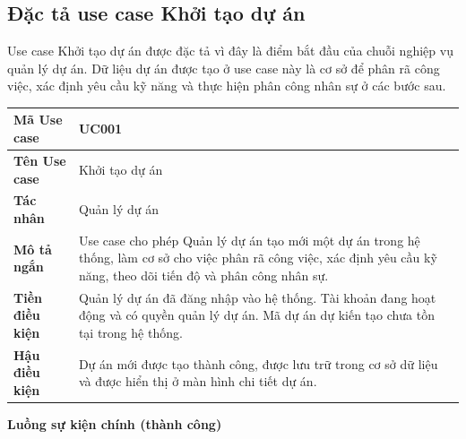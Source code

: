 \documentclass[../DoAn.tex]{subfiles}
\begin{document}
\newcommand{\ucTableText}{\small\setlength{\LTleft}{0pt}\setlength{\LTright}{0pt}}
\newcommand{\ucDataText}{\small\setlength{\tabcolsep}{2pt}\setlength{\LTleft}{0pt}\setlength{\LTright}{0pt}}

\subsection{Đặc tả use case Khởi tạo dự án}
\label{subsection:2.3.1}
Use case Khởi tạo dự án được đặc tả vì đây là điểm bắt đầu của chuỗi nghiệp vụ quản lý dự án. Dữ liệu dự án được tạo ở use case này là cơ sở để phân rã công việc, xác định yêu cầu kỹ năng và thực hiện phân công nhân sự ở các bước sau.

{\ucTableText
\begin{longtable}{|>{\columncolor{ucLabelBg}\bfseries}p{}|p{}|}
\hline
Mã Use case & UC001 \\ \hline
Tên Use case & Khởi tạo dự án \\ \hline
Tác nhân & Quản lý dự án \\ \hline
Mô tả ngắn & Use case cho phép Quản lý dự án tạo mới một dự án trong hệ thống, làm cơ sở cho việc phân rã công việc, xác định yêu cầu kỹ năng, theo dõi tiến độ và phân công nhân sự. \\ \hline
Tiền điều kiện & Quản lý dự án đã đăng nhập vào hệ thống. Tài khoản đang hoạt động và có quyền quản lý dự án. Mã dự án dự kiến tạo chưa tồn tại trong hệ thống. \\ \hline
Hậu điều kiện & Dự án mới được tạo thành công, được lưu trữ trong cơ sở dữ liệu và được hiển thị ở màn hình chi tiết dự án. \\ \hline
\end{longtable}
}

\textbf{Luồng sự kiện chính (thành công)}
\end{document}

